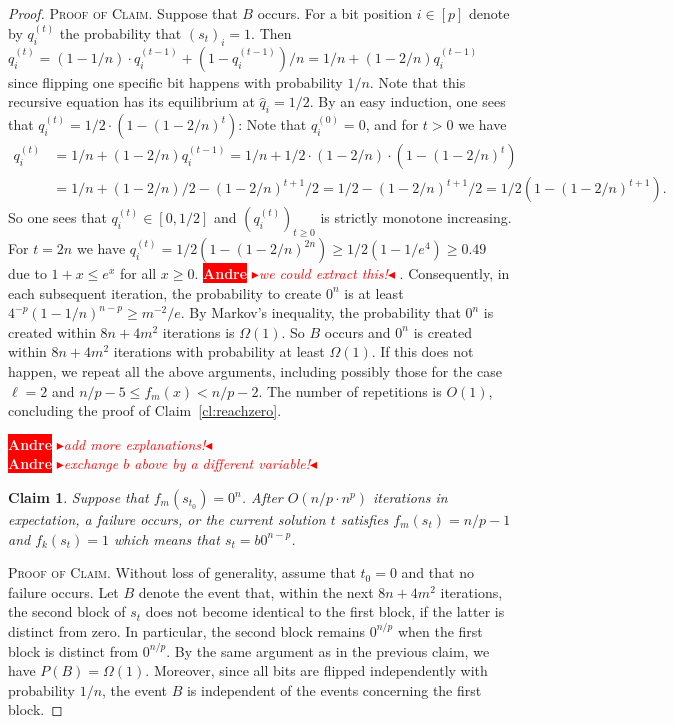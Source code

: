 \documentclass[
sigconf = false, %
review = false, %
screen = true, %
anonymous = true, %
format=acmsmall
]{acmart}
\renewcommand{\Pr}{P}
\newtheorem{claim}{Claim}
\newenvironment{proofofclaim}{\textsc{Proof of Claim.}}{\hfill\scriptsize\scalebox{1}{$\blacksquare$}}
\newcommand{\nbc}[3]{
		{\colorbox{#3}{\bfseries\sffamily\scriptsize\textcolor{white}{#1}}}
		{\textcolor{#3}{\sf\small$\blacktriangleright$\textit{#2}$\blacktriangleleft$}}
}
\newcommand{\andre}[1]{\nbc{Andre}{#1}{red}}
\begin{document}
\begin{proof}
\begin{proofofclaim}
    Suppose that $B$ occurs. For a bit position $i \in [p]$ denote by $q_i^{(t)}$ the probability that $(s_t)_i=1$. Then $q_i^{(t)}=(1-1/n) \cdot q_i^{(t-1)} + (1-q_i^{(t-1)})/n = 1/n + (1-2/n)q_i^{(t-1)}$ since flipping one specific bit happens with probability $1/n$. Note that this recursive equation has its equilibrium at $\hat{q}_i= 1/2$. By an easy induction, one sees that $q_i^{(t)} = 1/2 \cdot (1-(1-2/n)^t)$: Note that $q_i^{(0)}=0$, and for $t>0$ we have
    \begin{align*}
    	q_i^{(t)} &= 1/n + (1-2/n)q_i^{(t-1)} = 1/n + 1/2 \cdot (1-2/n) \cdot (1-(1-2/n)^t)\\
    	&= 1/n + (1-2/n)/2 - (1-2/n)^{t+1}/2 = 1/2-(1-2/n)^{t+1}/2 = 1/2(1-(1-2/n)^{t+1}).
    \end{align*}
    So one sees that $q_i^{(t)} \in [0,1/2]$ and $(q_i^{(t)})_{t \geq 0}$ is strictly monotone increasing. For $t=2n$ we have $q_i^{(t)} = 1/2(1-(1-2/n)^{2n}) \geq 1/2(1-1/e^4) \geq 0.49$ due to $1+x \leq e^x$ for all $x \geq 0$. \andre{we could extract this!}. Consequently, in each subsequent iteration, the probability to create $0^n$ is at least $4^{-p}(1-1/n)^{n-p} \geq m^{-2}/e$. By Markov's inequality, the probability that $0^n$ is created within $8n+4m^2$ iterations is $\Omega(1)$. So $B$ occurs and $0^n$ is created within $8n+4m^2$ iterations with probability at least $\Omega(1)$. If this does not happen, we repeat all the above arguments, including possibly those for the case $\ell=2$ and $n/p-5 \leq f_m(x) < n/p-2$. The number of repetitions is $O(1)$, concluding the proof of Claim~\ref{cl:reachzero}. 
\end{proofofclaim}

\andre{add more explanations!}\\
\andre{exchange $b$ above by a different variable!}

\begin{claim}
	\label{cl:reachfirst-b-remaining-zero}
	Suppose that $f_m(s_{t_0})=0^n$. After $O(n/p \cdot n^p)$ iterations in expectation, a failure occurs, or the current solution $t$ satisfies $f_m(s_t) = n/p-1$ and $f_k(s_t)=1$ which means that $s_t=b0^{n-p}$. 
\end{claim}

\begin{proofofclaim}
	Without loss of generality, assume that $t_0=0$ and that no failure occurs. Let $B$ denote the event that, within the next $8n+4m^2$ iterations, the second block of $s_t$ does not become identical to the first block, if the latter is distinct from zero. In particular, the second block remains $0^{n/p}$ when the first block is distinct from $0^{n/p}$. By the same argument as in the previous claim, we have $\Pr(B)=\Omega(1)$. Moreover, since all bits are flipped independently with probability $1/n$, the event $B$ is independent of the events concerning the first block. %
	

\end{proofofclaim}
\end{proof}
\end{document}
